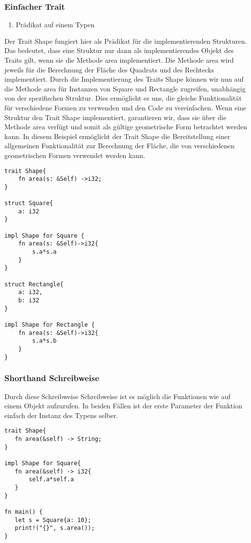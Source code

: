 \documentclass[a4paper, 1ppt]{article}
\begin{document}
\subsubsection{Einfacher Trait}
\begin{enumerate}
		\item Prädikat auf einem Typen
\end{enumerate}
Der Trait Shape fungiert hier als Prädikat für die implementierenden Strukturen. Das bedeutet, dass eine Struktur nur dann als implementierendes Objekt des Traits gilt, wenn sie die Methode area implementiert.
Die Methode area wird jeweils für die Berechnung der Fläche des Quadrats und des Rechtecks implementiert.
Durch die Implementierung des Traits Shape können wir nun auf die Methode area für Instanzen von Square und Rectangle zugreifen, unabhängig von der spezifischen Struktur. Dies ermöglicht es uns, die gleiche Funktionalität für verschiedene Formen zu verwenden und den Code zu vereinfachen.
 Wenn eine Struktur den Trait Shape implementiert, garantieren wir, dass sie über die Methode area verfügt und somit als gültige geometrische Form betrachtet werden kann.
 In diesem Beispiel ermöglicht der Trait Shape die Bereitstellung einer allgemeinen Funktionalität zur Berechnung der Fläche, die von verschiedenen geometrischen Formen verwendet werden kann.
\begin{verbatim}
trait Shape{
    fn area(s: &Self) ->i32;
}

struct Square{
    a: i32
}

impl Shape for Square {
    fn area(s: &Self)->i32{
        s.a*s.a
    }
}

struct Rectangle{
    a: i32,
    b: i32
}

impl Shape for Rectangle {
    fn area(s: &Self)->i32{
        s.a*s.b
    }
}

\end{verbatim}
\subsubsection{Shorthand Schreibweise}
Durch diese Schreibweise Schreibweise ist es möglich die Funktionen wie auf einem Objekt aufzurufen. In beiden Fällen ist der erste Parameter der Funktion einfach der Instanz des Typens selber.
\begin{verbatim}
trait Shape{
   fn area(&self) -> String;
}

impl Shape for Square{
   fn area(&self) -> i32{
       self.a*self.a
   }
}

fn main() {
   let s = Square{a: 10};
   print!("{}", s.area());
}
\end{verbatim}
\end{document}
